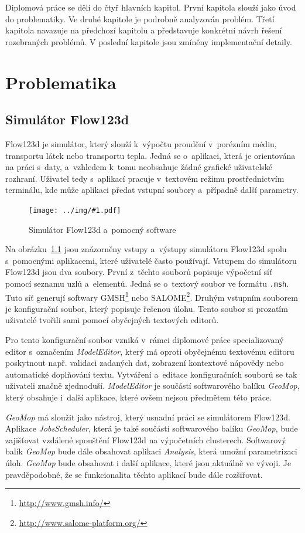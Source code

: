 \documentclass[FM,bw,DP]{tulthesis}
\newcommand{\includeimg}[2]{%
\begin{figure}[h]
	\centering
    \texttt{[image: ../img/\#1.pdf]}
    \caption{#2}
	\label{img:#1}
\end{figure}
}
\begin{document}
Diplomová práce se dělí do čtyř hlavních kapitol. První kapitola slouží jako úvod do problematiky. Ve druhé kapitole je podrobně analyzován problém. Třetí kapitola navazuje na předchozí kapitolu a představuje konkrétní návrh řešení rozebraných problémů. V poslední kapitole jsou zmíněny implementační detaily.


\chapter{Problematika}

\section{Simulátor Flow123d}

Flow123d je simulátor, který slouží k~výpočtu proudění v~porézním médiu, transportu látek nebo transportu tepla. Jedná se o~aplikaci, která je orientována na práci s~daty, a~vzhledem k~tomu neobsahuje žádné grafické uživatelské rozhraní. Uživatel tedy s~aplikací pracuje v~textovém režimu prostřednictvím terminálu, kde může aplikaci předat vstupní soubory a~případně další parametry.

\includeimg{flow123d}{Simulátor Flow123d a~pomocný software}

Na obrázku~\ref{img:flow123d} jsou znázorněny vstupy a~výstupy simulátoru Flow123d spolu s~pomocnými aplikacemi, které uživatelé často používají. Vstupem do simulátoru Flow123d jsou dva soubory. První z~těchto souborů popisuje výpočetní síť pomocí seznamu uzlů a~elementů. Jedná se o~textový soubor ve formátu \texttt{.msh}. Tuto síť generují softwary GMSH\footnote{\url{http://www.gmsh.info/}} nebo SALOME\footnote{\url{http://www.salome-platform.org/}}. Druhým vstupním souborem je konfigurační soubor, který popisuje řešenou úlohu. Tento soubor si prozatím uživatelé tvořili sami pomocí obyčejných textových editorů.

Pro tento konfigurační soubor vzniká v~rámci diplomové práce specializovaný editor s~označením \textit{ModelEditor}, který má oproti obyčejnému textovému editoru poskytnout např. validaci zadaných dat, zobrazení kontextové nápovědy nebo automatické doplňování textu. Vytváření a~editace konfiguračních souborů se tak uživateli značně zjednoduší. \textit{ModelEditor} je součástí softwarového balíku \textit{GeoMop}, který obsahuje i~další aplikace, které ovšem nejsou předmětem této práce.

\textit{GeoMop} má sloužit jako nástroj, který usnadní práci se simulátorem Flow123d. Aplikace \textit{JobsScheduler}, která je také součástí softwarového balíku \textit{GeoMop}, bude zajišťovat vzdálené spouštění Flow123d na výpočetních clusterech. Softwarový balík \textit{GeoMop} bude dále obsahovat aplikaci \textit{Analysis}, která umožní parametrizaci úloh. \textit{GeoMop} bude obsahovat i další aplikace, které jsou aktuálně ve vývoji. Je pravděpo\-dobné, že se funkcionalita těchto aplikací bude dále rozšiřovat.
\end{document}

